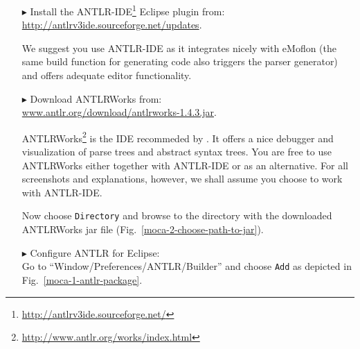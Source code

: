 \begin{enumerate}
\item[$\blacktriangleright$] Install the ANTLR-IDE\footnote{\url{http://antlrv3ide.sourceforge.net/}} Eclipse plugin from:\\ \url{http://antlrv3ide.sourceforge.net/updates}.

We suggest you use ANTLR-IDE as it integrates nicely with eMoflon (the same build function for generating code also triggers the parser generator) and offers adequate editor functionality.

\item[$\blacktriangleright$] Download ANTLRWorks from:\\ \url{www.antlr.org/download/antlrworks-1.4.3.jar}.

ANTLRWorks\footnote{\url{http://www.antlr.org/works/index.html}} is the IDE recommeded by \cite{ANTLR}.  
It offers a nice debugger and visualization of parse trees and abstract syntax trees.
You are free to use ANTLRWorks either together with ANTLR-IDE or as an alternative.
For all screenshots and explanations, however, we shall assume you choose to work with ANTLR-IDE.  

Now choose \texttt{Directory} and browse to the directory with the downloaded ANTLRWorks jar file (Fig.~\ref{moca-2-choose-path-to-jar}).

\item[$\blacktriangleright$] Configure ANTLR for Eclipse:\\ Go to ``Window/Preferences/ANTLR/Builder'' and choose \texttt{Add} as depicted in Fig.~\ref{moca-1-antlr-package}.


\end{enumerate}
